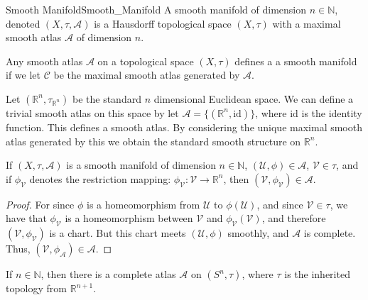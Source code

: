     \begin{fdefinition}{Smooth Manifold}{Smooth_Manifold}
        A smooth manifold of dimension $n\in\mathbb{N}$, denoted
        $(X,\tau,\mathcal{A})$ is a Hausdorff topological space
        $(X,\tau)$ with a maximal smooth atlas $\mathcal{A}$ of
        dimension $n$.
    \end{fdefinition}
    Any smooth atlas $\mathcal{A}$ on a topological space $(X,\tau)$
    defines a a smooth manifold if we let $\mathcal{C}$ be the maximal
    smooth atlas generated by $\mathcal{A}$.
    \begin{example}
        Let $(\mathbb{R}^{n},\tau_{\mathbb{R}^{n}})$ be the standard
        $n$ dimensional Euclidean space. We can define a trivial smooth
        atlas on this space by let
        $\mathcal{A}=\{(\mathbb{R}^{n},\textrm{id})\}$, where $\textrm{id}$
        is the identity function. This defines a smooth atlas. By
        considering the unique maximal smooth atlas generated by this
        we obtain the standard smooth structure on $\mathbb{R}^{n}$.
    \end{example}
    \begin{theorem}
        If $(X,\tau,\mathcal{A})$ is a smooth manifold of dimension
        $n\in\mathbb{N}$, $(\mathcal{U},\phi)\in\mathcal{A}$,
        $\mathcal{V}\in\tau$, and if $\phi_{\mathcal{V}}$ denotes
        the restriction mapping:
        $\phi_{\mathcal{V}}:\mathcal{V}\rightarrow\mathbb{R}^{n}$,
        then $(\mathcal{V},\phi_{\mathcal{V}})\in\mathcal{A}$.
    \end{theorem}
    \begin{proof}
        For since $\phi$ is a homeomorphism from $\mathcal{U}$ to
        $\phi(\mathcal{U})$, and since $\mathcal{V}\in\tau$, we have
        that $\phi_{\mathcal{V}}$ is a homeomorphism between
        $\mathcal{V}$ and $\phi_{\mathcal{V}}(\mathcal{V})$, and
        therefore $(\mathcal{V},\phi_{\mathcal{V}})$ is a chart. But
        this chart meets $(\mathcal{U},\phi)$ smoothly, and $\mathcal{A}$
        is complete. Thus,
        $(\mathcal{V},\phi_{\mathcal{A}})\in\mathcal{A}$.
    \end{proof}
    \begin{theorem}
        If $n\in\mathbb{N}$, then there is a complete atlas
        $\mathcal{A}$ on $(S^{n},\tau)$, where $\tau$ is the inherited
        topology from $\mathbb{R}^{n+1}$.
    \end{theorem}

